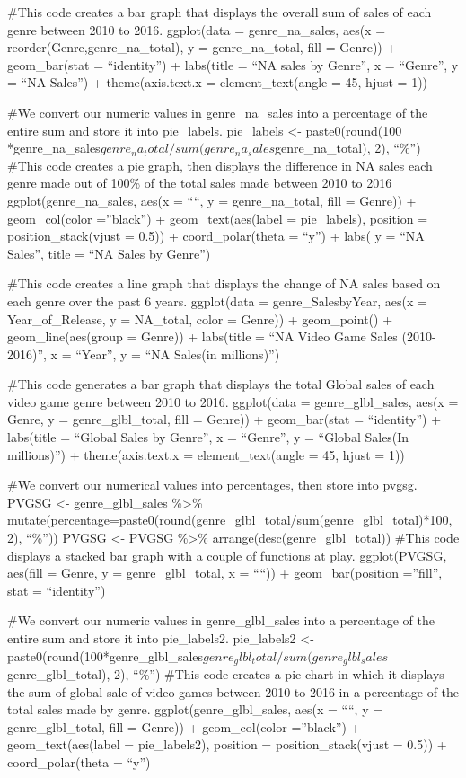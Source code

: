 \documentclass[
]{article}
\begin{document}
\#This code creates a bar graph that displays the overall sum of sales
of each genre between 2010 to 2016. ggplot(data = genre\_na\_sales,
aes(x = reorder(Genre,genre\_na\_total), y = genre\_na\_total, fill =
Genre)) + geom\_bar(stat = ``identity'') + labs(title = ``NA sales by
Genre'', x = ``Genre'', y = ``NA Sales'') + theme(axis.text.x =
element\_text(angle = 45, hjust = 1))

\#We convert our numeric values in genre\_na\_sales into a percentage of
the entire sum and store it into pie\_labels. pie\_labels \textless-
paste0(round(100
*genre\_na\_sales\(genre_na_total/sum(genre_na_sales\)genre\_na\_total),
2), ``\%'') \#This code creates a pie graph, then displays the
difference in NA sales each genre made out of 100\% of the total sales
made between 2010 to 2016 ggplot(genre\_na\_sales, aes(x = ````, y =
genre\_na\_total, fill = Genre)) + geom\_col(color =''black'') +
geom\_text(aes(label = pie\_labels), position = position\_stack(vjust =
0.5)) + coord\_polar(theta = ``y'') + labs( y = ``NA Sales'', title =
``NA Sales by Genre'')

\#This code creates a line graph that displays the change of NA sales
based on each genre over the past 6 years. ggplot(data =
genre\_SalesbyYear, aes(x = Year\_of\_Release, y = NA\_total, color =
Genre)) + geom\_point() + geom\_line(aes(group = Genre)) + labs(title =
``NA Video Game Sales (2010-2016)'', x = ``Year'', y = ``NA Sales\n(in
millions)'')

\#This code generates a bar graph that displays the total Global sales
of each video game genre between 2010 to 2016. ggplot(data =
genre\_glbl\_sales, aes(x = Genre, y = genre\_glbl\_total, fill =
Genre)) + geom\_bar(stat = ``identity'') + labs(title = ``Global Sales
by Genre'', x = ``Genre'', y = ``Global Sales\n(In millions)'') +
theme(axis.text.x = element\_text(angle = 45, hjust = 1))

\#We convert our numerical values into percentages, then store into
pvgsg. PVGSG \textless- genre\_glbl\_sales \%\textgreater\%
mutate(percentage=paste0(round(genre\_glbl\_total/sum(genre\_glbl\_total)*100,
2), ``\%'')) PVGSG \textless- PVGSG \%\textgreater\%
arrange(desc(genre\_glbl\_total)) \#This code displays a stacked bar
graph with a couple of functions at play. ggplot(PVGSG, aes(fill =
Genre, y = genre\_glbl\_total, x = ````)) + geom\_bar(position
=''fill'', stat = ``identity'')

\#We convert our numeric values in genre\_glbl\_sales into a percentage
of the entire sum and store it into pie\_labels2. pie\_labels2
\textless-
paste0(round(100*genre\_glbl\_sales\(genre_glbl_total/sum(genre_glbl_sales\)genre\_glbl\_total),
2), ``\%'') \#This code creates a pie chart in which it displays the sum
of global sale of video games between 2010 to 2016 in a percentage of
the total sales made by genre. ggplot(genre\_glbl\_sales, aes(x = ````,
y = genre\_glbl\_total, fill = Genre)) + geom\_col(color =''black'') +
geom\_text(aes(label = pie\_labels2), position = position\_stack(vjust =
0.5)) + coord\_polar(theta = ``y'')
\end{document}
